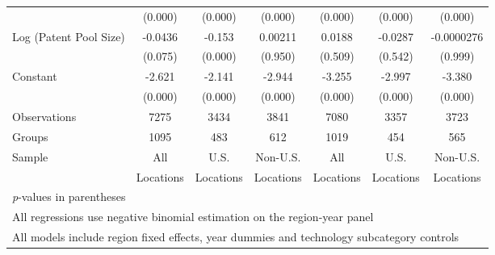 \begin{table}[htbp]
\begin{tabular}{l*{6}{c}}
                &  (0.000)&  (0.000)&  (0.000)&  (0.000)&  (0.000)&  (0.000)\\
Log (Patent Pool Size)&  -0.0436&   -0.153&  0.00211&   0.0188&  -0.0287&-0.0000276\\
                &  (0.075)&  (0.000)&  (0.950)&  (0.509)&  (0.542)&  (0.999)\\
Constant        &   -2.621&   -2.141&   -2.944&   -3.255&   -2.997&   -3.380\\
                &  (0.000)&  (0.000)&  (0.000)&  (0.000)&  (0.000)&  (0.000)\\
\hline
Observations    &     7275&     3434&     3841&     7080&     3357&     3723\\
Groups          &     1095&      483&      612&     1019&      454&      565\\
Sample&All &U.S. &Non-U.S.&All &U.S. &Non-U.S. \\
          &Locations &Locations&Locations&Locations &Locations&Locations \\
\hline\hline
\multicolumn{7}{l}{\footnotesize \textit{p}-values in parentheses}\\
\multicolumn{7}{l}{\footnotesize All regressions use negative binomial estimation on the region-year panel}\\
\multicolumn{7}{l}{\footnotesize All models include region fixed effects, year dummies and technology subcategory controls}\\
\end{tabular}
\end{table}

